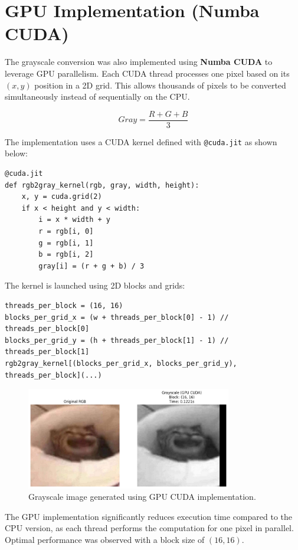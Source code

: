 \documentclass[a4paper,12pt]{article}
\begin{document}
\section*{GPU Implementation (Numba CUDA)}

The grayscale conversion was also implemented using \textbf{Numba CUDA} to leverage GPU parallelism.
Each CUDA thread processes one pixel based on its $(x, y)$ position in a 2D grid.
This allows thousands of pixels to be converted simultaneously instead of sequentially on the CPU.

\[
Gray = \frac{R + G + B}{3}
\]

The implementation uses a CUDA kernel defined with \texttt{@cuda.jit} as shown below:

\begin{verbatim}
@cuda.jit
def rgb2gray_kernel(rgb, gray, width, height):
    x, y = cuda.grid(2)
    if x < height and y < width:
        i = x * width + y
        r = rgb[i, 0]
        g = rgb[i, 1]
        b = rgb[i, 2]
        gray[i] = (r + g + b) / 3
\end{verbatim}

The kernel is launched using 2D blocks and grids:
\begin{verbatim}
threads_per_block = (16, 16)
blocks_per_grid_x = (w + threads_per_block[0] - 1) // threads_per_block[0]
blocks_per_grid_y = (h + threads_per_block[1] - 1) // threads_per_block[1]
rgb2gray_kernel[(blocks_per_grid_x, blocks_per_grid_y), threads_per_block](...)
\end{verbatim}
\begin{figure}
    \centering
    \includegraphics[width=0.8\textwidth]{image2.png}
 \caption{Grayscale image generated using GPU CUDA implementation.}
    \label{fig:placeholder}
\end{figure}


The GPU implementation significantly reduces execution time compared to the CPU version,
as each thread performs the computation for one pixel in parallel.
Optimal performance was observed with a block size of $(16,16)$.
\end{document}
